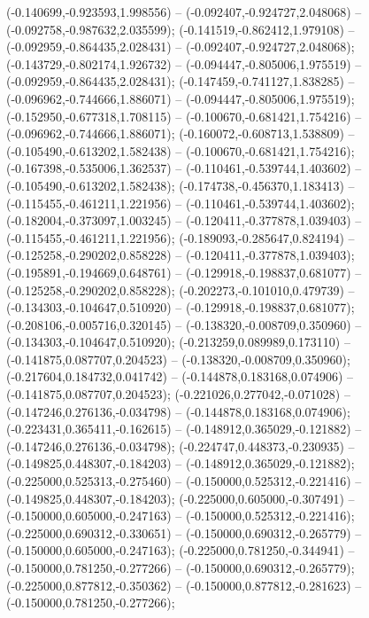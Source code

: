  (-0.140699,-0.923593,1.998556) -- (-0.092407,-0.924727,2.048068) -- (-0.092758,-0.987632,2.035599);
 (-0.141519,-0.862412,1.979108) -- (-0.092959,-0.864435,2.028431) -- (-0.092407,-0.924727,2.048068);
 (-0.143729,-0.802174,1.926732) -- (-0.094447,-0.805006,1.975519) -- (-0.092959,-0.864435,2.028431);
 (-0.147459,-0.741127,1.838285) -- (-0.096962,-0.744666,1.886071) -- (-0.094447,-0.805006,1.975519);
 (-0.152950,-0.677318,1.708115) -- (-0.100670,-0.681421,1.754216) -- (-0.096962,-0.744666,1.886071);
 (-0.160072,-0.608713,1.538809) -- (-0.105490,-0.613202,1.582438) -- (-0.100670,-0.681421,1.754216);
 (-0.167398,-0.535006,1.362537) -- (-0.110461,-0.539744,1.403602) -- (-0.105490,-0.613202,1.582438);
 (-0.174738,-0.456370,1.183413) -- (-0.115455,-0.461211,1.221956) -- (-0.110461,-0.539744,1.403602);
 (-0.182004,-0.373097,1.003245) -- (-0.120411,-0.377878,1.039403) -- (-0.115455,-0.461211,1.221956);
 (-0.189093,-0.285647,0.824194) -- (-0.125258,-0.290202,0.858228) -- (-0.120411,-0.377878,1.039403);
 (-0.195891,-0.194669,0.648761) -- (-0.129918,-0.198837,0.681077) -- (-0.125258,-0.290202,0.858228);
 (-0.202273,-0.101010,0.479739) -- (-0.134303,-0.104647,0.510920) -- (-0.129918,-0.198837,0.681077);
 (-0.208106,-0.005716,0.320145) -- (-0.138320,-0.008709,0.350960) -- (-0.134303,-0.104647,0.510920);
 (-0.213259,0.089989,0.173110) -- (-0.141875,0.087707,0.204523) -- (-0.138320,-0.008709,0.350960);
 (-0.217604,0.184732,0.041742) -- (-0.144878,0.183168,0.074906) -- (-0.141875,0.087707,0.204523);
 (-0.221026,0.277042,-0.071028) -- (-0.147246,0.276136,-0.034798) -- (-0.144878,0.183168,0.074906);
 (-0.223431,0.365411,-0.162615) -- (-0.148912,0.365029,-0.121882) -- (-0.147246,0.276136,-0.034798);
 (-0.224747,0.448373,-0.230935) -- (-0.149825,0.448307,-0.184203) -- (-0.148912,0.365029,-0.121882);
 (-0.225000,0.525313,-0.275460) -- (-0.150000,0.525312,-0.221416) -- (-0.149825,0.448307,-0.184203);
 (-0.225000,0.605000,-0.307491) -- (-0.150000,0.605000,-0.247163) -- (-0.150000,0.525312,-0.221416);
 (-0.225000,0.690312,-0.330651) -- (-0.150000,0.690312,-0.265779) -- (-0.150000,0.605000,-0.247163);
 (-0.225000,0.781250,-0.344941) -- (-0.150000,0.781250,-0.277266) -- (-0.150000,0.690312,-0.265779);
 (-0.225000,0.877812,-0.350362) -- (-0.150000,0.877812,-0.281623) -- (-0.150000,0.781250,-0.277266);
